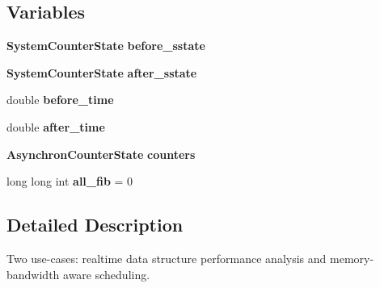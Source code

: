 \subsection*{Variables}
\begin{DoxyCompactItemize}
\item 
\mbox{\label{realtime_8cpp_ad0d469a9c20fe7016b9be95e443f5cbd}} 
\textbf{ System\+Counter\+State} {\bfseries before\+\_\+sstate}
\item 
\mbox{\label{realtime_8cpp_a3684fa4dfac013348b5abe2b3a602105}} 
\textbf{ System\+Counter\+State} {\bfseries after\+\_\+sstate}
\item 
\mbox{\label{realtime_8cpp_a85f10f39fe8cc10213c0bc87ee07187b}} 
double {\bfseries before\+\_\+time}
\item 
\mbox{\label{realtime_8cpp_a7790f27845e8d48f4f04a0f7c61d93fc}} 
double {\bfseries after\+\_\+time}
\item 
\mbox{\label{realtime_8cpp_a17adfa64106f41a0a9a2a0b65ad301ab}} 
\textbf{ Asynchron\+Counter\+State} {\bfseries counters}
\item 
\mbox{\label{realtime_8cpp_a3fc505aa811b2808316ed55b8466522a}} 
long long int {\bfseries all\+\_\+fib} = 0
\end{DoxyCompactItemize}


\subsection{Detailed Description}
Two use-\/cases\+: realtime data structure performance analysis and memory-\/bandwidth aware scheduling. 


